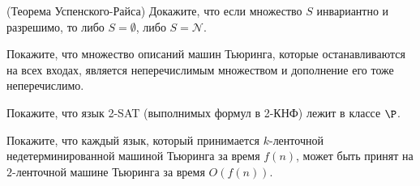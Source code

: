 \begin{task}
   (Теорема Успенского-Райса) Докажите, что если множество $S$ инвариантно и разрешимо, то либо $S = \emptyset$, либо $S = \mathcal{N}$. 
\end{task}

\begin{task}
   Покажите, что множество описаний машин Тьюринга, которые останавливаются на всех входах, является неперечислимым множеством и
   дополнение его тоже неперечислимо.
\end{task}

\begin{task}
	Покажите, что язык 2-SAT (выполнимых формул в 2-КНФ) лежит в классе $\P$. 
\end{task}


\breakline

\begin{ptask}{8}
    Покажите, что каждый язык, который принимается $k$-ленточной недетерминированной машиной Тьюринга за время $f(n)$, может быть
    принят на $2$-ленточной машине Тьюринга за время $O(f(n))$.
\end{ptask}